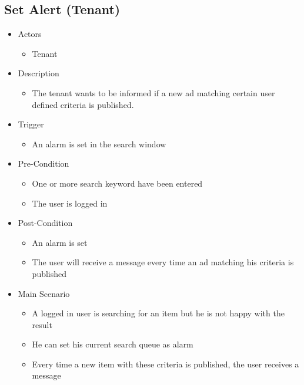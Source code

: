\documentclass[a4paper,11pt]{article}
\begin{document}
\subsection*{Set Alert (Tenant)}
\begin{itemize}
	\item Actors
		\begin{itemize}
			\item Tenant
		\end{itemize}
	\item Description
		\begin{itemize}
			\item The tenant wants to be informed if a new ad matching certain user defined criteria is published.
		\end{itemize}
	\item Trigger
		\begin{itemize}
			\item An alarm is set in the search window
		\end{itemize}
	\item Pre-Condition
		\begin{itemize}
			\item One or more search keyword have been entered
			\item The user is logged in
		\end{itemize}
	\item Post-Condition
		\begin{itemize}
			\item An alarm is set
			\item The user will receive a message every time an ad matching his criteria is published
		\end{itemize}
	\item Main Scenario
		\begin{itemize}
			\item A logged in user is searching for an item but he is not happy with the result
			\item He can set his current search queue as alarm
			\item Every time a new item with these criteria is published, the user receives a message
		\end{itemize}
\end{itemize}
\end{document}
